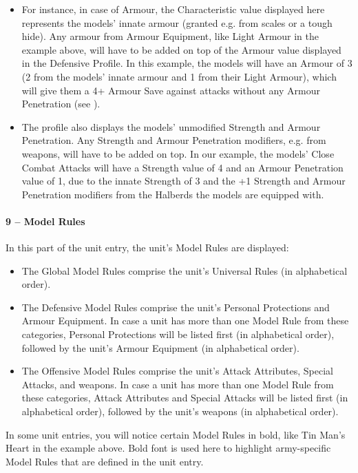 \begin{itemize}
\item For instance, in case of Armour, the Characteristic value displayed here represents the models' innate armour (granted e.g. from scales or a tough hide). Any armour from Armour Equipment, like Light Armour in the example above, will have to be added on top of the Armour value displayed in the Defensive Profile. In this example, the models will have an Armour of 3 (2 from the models' innate armour and 1 from their Light Armour), which will give them a 4+ Armour Save against attacks without any Armour Penetration (see ).
\item The profile also displays the models' unmodified Strength and Armour Penetration. Any Strength and Armour Penetration modifiers, e.g. from weapons, will have to be added on top. In our example, the models' Close Combat Attacks will have a Strength value of 4 and an Armour Penetration value of 1, due to the innate Strength of 3 and the +1 Strength and Armour Penetration modifiers from the Halberds the models are equipped with.
\end{itemize}

\paragraph{9 -- Model Rules}

In this part of the unit entry, the unit's Model Rules are displayed:

\begin{itemize}
\item The Global Model Rules comprise the unit's Universal Rules (in alphabetical order).
\item The Defensive Model Rules comprise the unit's Personal Protections and Armour Equipment. In case a unit has more than one Model Rule from these categories, Personal Protections will be listed first (in alphabetical order), followed by the unit's Armour Equipment (in alphabetical order).
\item The Offensive Model Rules comprise the unit's Attack Attributes, Special Attacks, and weapons. In case a unit has more than one Model Rule from these categories, Attack Attributes and Special Attacks will be listed first (in alphabetical order), followed by the unit's weapons (in alphabetical order).
\end{itemize}

In some unit entries, you will notice certain Model Rules in bold, like Tin Man's Heart in the example above. Bold font is used here to highlight army-specific Model Rules that are defined in the unit entry.

